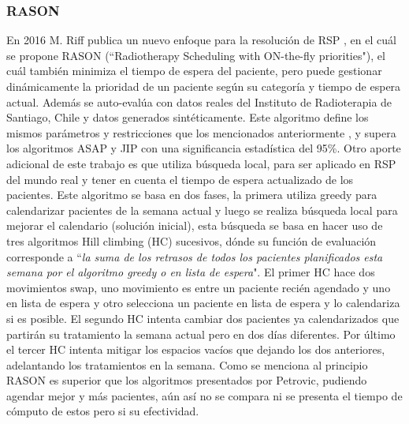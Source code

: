 \documentclass[letter, 10pt]{article}
\begin{document}
\subsubsection{RASON}
    En 2016 M. Riff publica un nuevo enfoque para la resolución de RSP \cite{siete}, en el cuál se propone RASON (``Radiotherapy Scheduling with ON-the-fly priorities"), el cuál también minimiza el tiempo de espera del paciente, pero puede gestionar dinámicamente la prioridad de un paciente según su categoría y tiempo de espera actual. Además se auto-evalúa con datos reales del Instituto de Radioterapia de Santiago, Chile y datos generados sintéticamente. Este algoritmo define los mismos parámetros y restricciones que los mencionados anteriormente \cite{seis}, y supera los algoritmos ASAP y JIP con una significancia estadística del 95\%. Otro aporte adicional de este trabajo es que utiliza búsqueda local, para ser aplicado en RSP del mundo real y tener en cuenta el tiempo de espera actualizado de los pacientes. Este algoritmo se basa en dos fases, la primera utiliza greedy para calendarizar pacientes de la semana actual y luego se realiza búsqueda local para mejorar el calendario (solución inicial), esta búsqueda se basa en hacer uso de tres algoritmos Hill climbing (HC) sucesivos, dónde su función de evaluación corresponde a ``\textit{la suma de los retrasos de todos los pacientes planificados esta semana por el algoritmo greedy o en lista de espera}". El primer HC hace dos movimientos swap, uno movimiento es entre un paciente recién agendado y uno en lista de espera y otro selecciona un paciente en lista de espera y lo calendariza si es posible. El segundo HC intenta cambiar dos pacientes ya calendarizados que partirán su tratamiento la semana actual pero en dos días diferentes. Por último el tercer HC intenta mitigar los espacios vacíos que dejando los dos anteriores, adelantando los tratamientos en la semana. Como se menciona al principio RASON es superior que los algoritmos presentados por Petrovic, pudiendo agendar mejor y más pacientes, aún así no se compara ni se presenta el tiempo de cómputo de estos pero si su efectividad.
\end{document}
